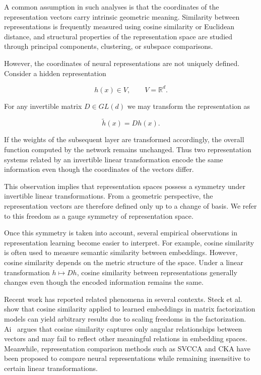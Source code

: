 \documentclass[11pt]{article}
\begin{document}
A common assumption in such analyses is that the coordinates of the
representation vectors carry intrinsic geometric meaning.
Similarity between representations is frequently measured using cosine
similarity or Euclidean distance, and structural properties of the
representation space are studied through principal components, clustering,
or subspace comparisons.

However, the coordinates of neural representations are not uniquely defined.
Consider a hidden representation

\[
h(x) \in V, \qquad V = \mathbb{R}^d .
\]

For any invertible matrix $D \in GL(d)$ we may transform the representation as

\[
\tilde h(x) = D h(x).
\]

If the weights of the subsequent layer are transformed accordingly,
the overall function computed by the network remains unchanged.
Thus two representation systems related by an invertible linear
transformation encode the same information even though the coordinates
of the vectors differ.

This observation implies that representation spaces possess a symmetry under
invertible linear transformations.
From a geometric perspective, the representation vectors are therefore
defined only up to a change of basis.
We refer to this freedom as a gauge symmetry of representation space.

Once this symmetry is taken into account, several empirical observations in
representation learning become easier to interpret.
For example, cosine similarity is often used to measure semantic similarity
between embeddings.
However, cosine similarity depends on the metric structure of the space.
Under a linear transformation $h \mapsto Dh$, cosine similarity between
representations generally changes even though the encoded information
remains the same.

Recent work has reported related phenomena in several contexts.
Steck et al.~\cite{Steck2024} show that cosine similarity applied to learned
embeddings in matrix factorization models can yield arbitrary results due
to scaling freedoms in the factorization.
Ai~\cite{Ai2026} argues that cosine similarity captures only angular
relationships between vectors and may fail to reflect other meaningful
relations in embedding spaces.
Meanwhile, representation comparison methods such as SVCCA and CKA have been
proposed to compare neural representations while remaining insensitive to
certain linear transformations.
\end{document}

